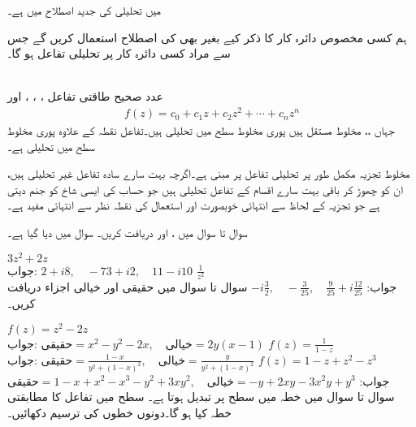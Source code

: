  میں تحلیلی کی جدید اصطلاح  میں  ہے۔  

ہم کسی مخصوص دائرہ کار کا ذکر کیے بغیر  بھی  کی اصطلاح استعمال کریں گے جس سے مراد کسی دائرہ کار پر تحلیلی تفاعل ہو گا۔

\quad {}\\
عدد صحیح طاقتی تفاعل ، ، ،   اور 
\begin{align*}
f(z)=c_0+c_1z+c_2z^2+\cdots+c_nz^n
\end{align*}
جہاں ،،  مخلوط مستقل ہیں پوری مخلوط سطح میں تحلیلی ہیں۔تفاعل  نقطہ  کے علاوہ پوری مخلوط سطح میں تحلیلی ہے۔

مخلوط تجزیہ مکمل طور پر تحلیلی تفاعل پر مبنی ہے۔اگرچہ بہت سارے سادہ تفاعل غیر تحلیلی ہیں، ان کو چھوڑ کر باقی بہت سارے اقسام کے تفاعل تحلیلی ہیں جو حساب کی ایسی شاخ کو جنم دیتی ہے جو تجزیہ کے لحاظ سے انتہائی خوبصورت اور استعمال کی نقطہ نظر سے انتہائی مفید ہے۔

 سوال  تا سوال  میں ،  اور  دریافت کریں۔ سوال میں دیا گیا ہے۔

\quad 
$3z^2+2z$\\
جواب:\quad
$2+i8,\quad -73+i2,\quad 11-i10$
\quad 
$\tfrac{1}{z^2}$\\
جواب:\quad
$-i\tfrac{3}{2},\quad -\tfrac{3}{25},\quad \tfrac{9}{25}+i\tfrac{12}{25}$
سوال  تا سوال  میں حقیقی اور خیالی اجزاء دریافت کریں۔

\quad
$f(z)=z^2-2z$\\
جواب:\quad
$\text{حقیقی}=x^2-y^2-2x,\quad \text{خیالی}=2y(x-1)$
\quad
$f(z)=\tfrac{1}{1-z}$\\
جواب:\quad
$\text{حقیقی}=\tfrac{1-x}{y^2+(1-x)^2},\quad \text{خیالی}=\tfrac{y}{y^2+(1-x)^2}$
\quad
$f(z)=1-z+z^2-z^3$\\
جواب:\quad
$\text{حقیقی}= 1-x+x^2-x^3-y^2+3xy^2,\quad \text{خیالی}=-y+2xy-3x^2y+y^3$
سوال  تا سوال  میں  خطہ  میں  سطح پر تبدیل ہوتا ہے۔ سطح میں  تفاعل  کا مطابقتی خطہ کیا ہو گا۔دونوں خطوں کی ترسیم دکھائیں۔

